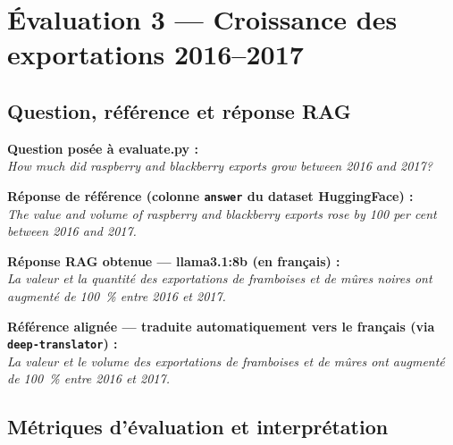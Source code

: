\documentclass[12pt,a4paper]{report}
\begin{document}
\section{Évaluation 3 — Croissance des exportations 2016--2017}

\subsection{Question, référence et réponse RAG}

\vspace{6pt}
\begin{evalbox}
\textbf{Question posée à evaluate.py :}\\[4pt]
\textit{How much did raspberry and blackberry exports grow between 2016 and 2017?}

\vspace{10pt}
\textbf{Réponse de référence (colonne \texttt{answer} du dataset HuggingFace) :}\\[4pt]
\textit{The value and volume of raspberry and blackberry exports rose by 100 per
cent between 2016 and 2017.}

\vspace{10pt}
\textbf{Réponse RAG obtenue — llama3.1:8b (en français) :}\\[4pt]
\textit{La valeur et la quantité des exportations de framboises et de mûres noires
ont augmenté de 100~\% entre 2016 et 2017.}

\vspace{10pt}
\textbf{Référence alignée — traduite automatiquement vers le français
(via \texttt{deep-translator}) :}\\[4pt]
\textit{La valeur et le volume des exportations de framboises et de mûres ont
augmenté de 100~\% entre 2016 et 2017.}
\end{evalbox}

\subsection{Métriques d'évaluation et interprétation}
\end{document}
